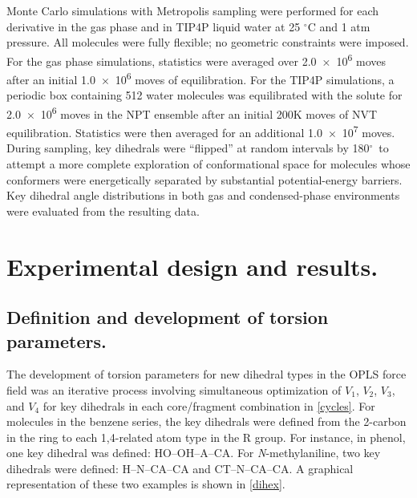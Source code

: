 \documentclass[12pt]{report}
\def\deg{$^{\circ}$}
\begin{document}
Monte Carlo simulations with Metropolis sampling were performed for each derivative in the gas phase and in TIP4P liquid water at 25 \deg C and 1 atm pressure. All molecules were fully flexible; no geometric constraints were imposed. For the gas phase simulations, statistics were averaged over \num{2.0e6} moves after an initial \num{1.0e6} moves of equilibration. For the TIP4P simulations, a periodic box containing 512 water molecules was equilibrated with the solute for \num{2.0e6} moves in the NPT ensemble after an initial 200K moves of NVT equilibration. Statistics were then averaged for an additional \num{1.0e7} moves. During sampling, key dihedrals were ``flipped'' at random intervals by 180\deg\ to attempt a more complete exploration of conformational space for molecules whose conformers were energetically separated by substantial potential-energy barriers. Key dihedral angle distributions in both gas and condensed-phase environments were evaluated from the resulting data.


\section{Experimental design and results.}

\subsection{Definition and development of torsion parameters.}

The development of torsion parameters for new dihedral types in the OPLS force field was an iterative process involving simultaneous optimization of $V_1$, $V_2$, $V_3$, and $V_4$ for key dihedrals in each core/fragment combination in \cref{cycles}. For molecules in the benzene series, the key dihedrals were defined from the 2-carbon in the ring to each 1,4-related atom type in the R group. For instance, in phenol, one key dihedral was defined: HO--OH--A--CA. For \textit{N}-methylaniline, two key dihedrals were defined: H--N--CA--CA and CT--N--CA--CA. A graphical representation of these two examples is shown in \cref{dihex}.
\end{document}

